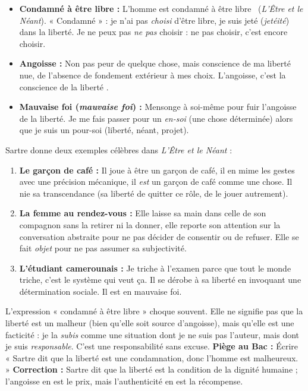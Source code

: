 \documentclass[11pt]{article}
\newcommand{\cle}[1]{{\popxbold\color{popdark}#1}}
\begin{document}
\begin{propriete}
\begin{itemize}
\item \textbf{Condamné à être libre :} \guillemotleft L'homme est condamné à être libre \guillemotright\ (\emph{L'Être et le Néant}). « Condamné » : je n'ai pas \emph{choisi} d'être libre, je suis jeté (\emph{jetéité}) dans la liberté. Je ne peux pas \emph{ne pas} choisir : ne pas choisir, c'est encore choisir.
\item \textbf{Angoisse :} Non pas peur de quelque chose, mais conscience de ma liberté nue, de l'absence de fondement extérieur à mes choix. \guillemotleft L'angoisse, c'est la conscience de la liberté \guillemotright.
\item \textbf{Mauvaise foi (\emph{mauvaise foi}) :} Mensonge à soi-même pour fuir l'angoisse de la liberté. Je me fais passer pour un \emph{en-soi} (une chose déterminée) alors que je suis un \cle{pour-soi} (liberté, néant, projet).
\end{itemize}
\end{propriete}

\begin{exemplebox}
Sartre donne deux exemples célèbres dans \emph{L'Être et le Néant} :
\begin{enumerate}
\item \textbf{Le garçon de café :} Il joue à être un garçon de café, il en mime les gestes avec une précision mécanique, il \emph{est} un garçon de café comme une chose. Il nie sa transcendance (sa liberté de quitter ce rôle, de le jouer autrement).
\item \textbf{La femme au rendez-vous :} Elle laisse sa main dans celle de son compagnon sans la retirer ni la donner, elle reporte son attention sur la conversation abstraite pour ne pas décider de consentir ou de refuser. Elle se fait \emph{objet} pour ne pas assumer sa subjectivité.
\item \textbf{L'étudiant camerounais :} \guillemotleft Je triche à l'examen parce que tout le monde triche, c'est le système qui veut ça. \guillemotright Il se dérobe à sa liberté en invoquant une détermination sociale. Il est en \cle{mauvaise foi}.
\end{enumerate}
\end{exemplebox}

\begin{attention}
L'expression « condamné à être libre » choque souvent. Elle ne signifie pas que la liberté est un malheur (bien qu'elle soit source d'angoisse), mais qu'elle est une \cle{facticité} : je la \emph{subis} comme une situation dont je ne suis pas l'auteur, mais dont je suis \emph{responsable}. C'est une \cle{responsabilité sans excuse}. \textbf{Piège au Bac :} Écrire « Sartre dit que la liberté est une condamnation, donc l'homme est malheureux. » \textbf{Correction :} Sartre dit que la liberté est la condition de la dignité humaine ; l'angoisse en est le prix, mais l'authenticité en est la récompense.
\end{attention}
\end{document}
